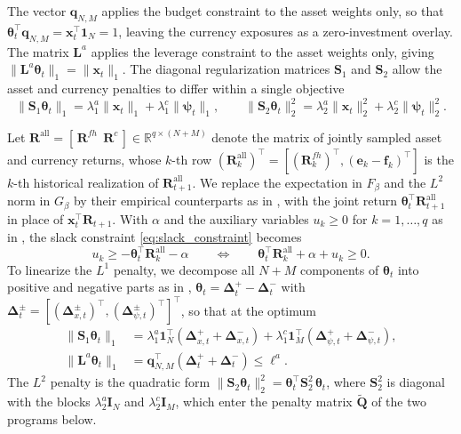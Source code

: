 The vector $\bm{q}_{N,M}$ applies the budget constraint to the asset weights only, so that
$\bm{\theta}_t^\top \bm{q}_{N,M} = \bm{x}_t^\top \bm{1}_N = 1$, leaving the currency exposures as a
zero-investment overlay. The matrix $\bm{L}^a$ applies the leverage constraint
to the asset weights only, giving $\|\bm{L}^a\bm{\theta}_t\|_1 = \|\bm{x}_t\|_1$. The diagonal regularization
matrices $\bm{S}_1$ and $\bm{S}_2$ allow the asset and currency penalties to differ within a
single objective
\begin{equation*}
    \|\bm{S}_1 \bm{\theta}_t\|_1 = \lambda_1^a \|\bm{x}_t\|_1 + \lambda_1^c \|\bm{\psi}_t\|_1,
    \qquad
    \|\bm{S}_2 \bm{\theta}_t\|_2^2 = \lambda_2^a \|\bm{x}_t\|_2^2 + \lambda_2^c \|\bm{\psi}_t\|_2^2.
\end{equation*}

Let $\bm{R}^{\text{all}} = [\, \bm{R}^{fh}\ \ \bm{R}^c \,] \in \mathbb{R}^{q \times (N+M)}$ denote the
matrix of jointly sampled asset and currency returns, whose $k$-th row
$(\bm{R}^{\text{all}}_k)^\top = [(\bm{R}^{fh}_k)^\top, (\bm{e}_k - \bm{f}_k)^\top]$ is the $k$-th historical
realization of $\bm{R}^{\text{all}}_{t+1}$. We replace the expectation in $F_\beta$ and the $L^2$ norm in $G_\beta$
by their empirical counterparts as in , with the joint return
$\bm{\theta}_t^\top \bm{R}^{\text{all}}_{t+1}$ in place of $\bm{x}_t^\top \bm{R}_{t+1}$.  With $\alpha$ and
the auxiliary variables $u_k \ge 0$ for $k = 1, \dots, q$ as in , the slack constraint \eqref{eq:slack_constraint} becomes
\begin{equation*}
    u_k \ge -\bm{\theta}_t^\top \bm{R}^{\text{all}}_k - \alpha
    \qquad \Longleftrightarrow \qquad
    \bm{\theta}_t^\top \bm{R}^{\text{all}}_k + \alpha + u_k \ge 0.
\end{equation*}
To linearize the $L^1$ penalty, we decompose all $N+M$ components of $\bm{\theta}_t$ into positive and negative parts
as in , $\bm{\theta}_t = \bm{\Delta}_t^+ - \bm{\Delta}_t^-$ with
$\bm{\Delta}_t^\pm = [(\bm{\Delta}_{x,t}^\pm)^\top, (\bm{\Delta}_{\psi,t}^\pm)^\top]^\top$, so that at the optimum
\begin{equation*}
\begin{aligned}
    \|\bm{S}_1 \bm{\theta}_t\|_1 &= \lambda_1^a \bm{1}_N^\top (\bm{\Delta}_{x,t}^+ + \bm{\Delta}_{x,t}^-)
    + \lambda_1^c \bm{1}_M^\top (\bm{\Delta}_{\psi,t}^+ + \bm{\Delta}_{\psi,t}^-), \\
    \|\bm{L}^a \bm{\theta}_t\|_1 &= \bm{q}_{N,M}^\top (\bm{\Delta}_t^+ + \bm{\Delta}_t^-) \le \ell^a.
\end{aligned}
\end{equation*}
The $L^2$ penalty is the quadratic form $\|\bm{S}_2 \bm{\theta}_t\|_2^2 = \bm{\theta}_t^\top \bm{S}_2^2\, \bm{\theta}_t$,
where $\bm{S}_2^2$ is diagonal with the blocks $\lambda_2^a \bm{I}_N$ and $\lambda_2^c \bm{I}_M$, which enter the
penalty matrix $\tilde{\bm{Q}}$ of the two programs below.


